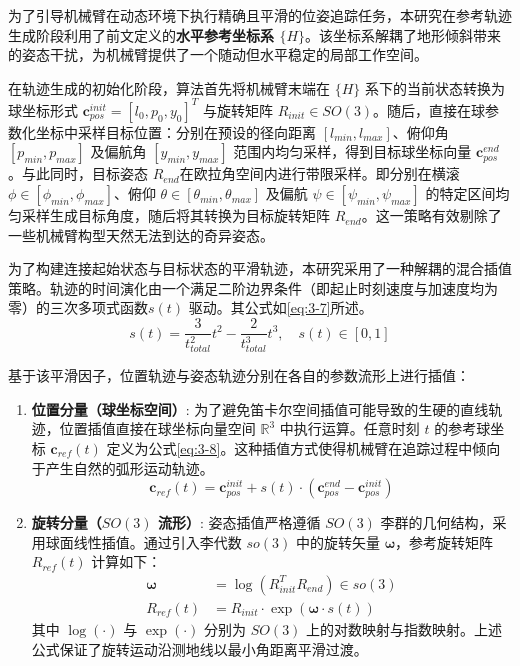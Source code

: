 为了引导机械臂在动态环境下执行精确且平滑的位姿追踪任务，本研究在参考轨迹生成阶段利用了前文定义的\textbf{水平参考坐标系 $\{H\}$}。该坐标系解耦了地形倾斜带来的姿态干扰，为机械臂提供了一个随动但水平稳定的局部工作空间。

在轨迹生成的初始化阶段，算法首先将机械臂末端在 $\{H\}$ 系下的当前状态转换为球坐标形式 $\mathbf{c}_{pos}^{init} = [l_0, p_0, y_0]^T$ 与旋转矩阵 $R_{init} \in SO(3)$。随后，直接在球参数化坐标中采样目标位置：分别在预设的径向距离 $[l_{min}, l_{max}]$、俯仰角 $[p_{min}, p_{max}]$ 及偏航角 $[y_{min}, y_{max}]$ 范围内均匀采样，得到目标球坐标向量 $\mathbf{c}_{pos}^{end}$。与此同时，目标姿态 $R_{end}$在欧拉角空间内进行带限采样。即分别在横滚 $\phi \in [\phi_{min}, \phi_{max}]$、俯仰 $\theta \in [\theta_{min}, \theta_{max}]$ 及偏航 $\psi \in [\psi_{min}, \psi_{max}]$ 的特定区间均匀采样生成目标角度，随后将其转换为目标旋转矩阵 $R_{end}$。这一策略有效剔除了一些机械臂构型天然无法到达的奇异姿态。

为了构建连接起始状态与目标状态的平滑轨迹，本研究采用了一种解耦的混合插值策略。轨迹的时间演化由一个满足二阶边界条件（即起止时刻速度与加速度均为零）的三次多项式函数$s(t)$ 驱动。其公式如\eqref{eq:3-7}所述。
\begin{equation}\label{eq:3-7}
    s(t) = \frac{3}{t_{total}^2} t^2 - \frac{2}{t_{total}^3} t^3, \quad s(t) \in [0, 1]
\end{equation}

基于该平滑因子，位置轨迹与姿态轨迹分别在各自的参数流形上进行插值：

\begin{enumerate}
    \item \textbf{位置分量（球坐标空间）}: 为了避免笛卡尔空间插值可能导致的生硬的直线轨迹，位置插值直接在球坐标向量空间 $\mathbb{R}^3$ 中执行运算。任意时刻 $t$ 的参考球坐标 $\mathbf{c}_{ref}(t)$ 定义为公式\eqref{eq:3-8}。这种插值方式使得机械臂在追踪过程中倾向于产生自然的弧形运动轨迹。
          \begin{equation} \label{eq:3-8}
              \mathbf{c}_{ref}(t) = \mathbf{c}_{pos}^{init} + s(t) \cdot (\mathbf{c}_{pos}^{end} - \mathbf{c}_{pos}^{init})
          \end{equation}
    \item \textbf{旋转分量（$SO(3)$ 流形）}: 姿态插值严格遵循 $SO(3)$ 李群\cite{hall2015lie, humphreys2012introduction}的几何结构，采用球面线性插值。通过引入李代数 $so(3)$ 中的旋转矢量 $\boldsymbol{\omega}$，参考旋转矩阵 $R_{ref}(t)$ 计算如下：
          \begin{equation}
              \begin{aligned}
                  \boldsymbol{\omega} & = \log(R_{init}^T R_{end}) \in so(3)                  \\
                  R_{ref}(t)          & = R_{init} \cdot \exp(\boldsymbol{\omega} \cdot s(t))
              \end{aligned}
          \end{equation}
          其中 $\log(\cdot)$ 与 $\exp(\cdot)$ 分别为 $SO(3)$ 上的对数映射与指数映射。上述公式保证了旋转运动沿测地线以最小角距离平滑过渡。
\end{enumerate}

